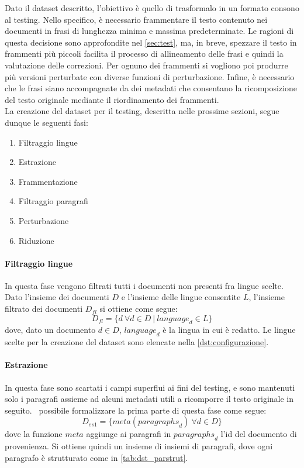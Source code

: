 Dato il dataset descritto, l'obiettivo è quello di trasformalo in un formato consono al testing. Nello specifico, è necessario frammentare il testo contenuto nei documenti in frasi di lunghezza minima e massima predeterminate. Le ragioni di questa decisione sono approfondite nel \autoref{sec:test}, ma, in breve, spezzare il testo in frammenti più piccoli facilita il processo di allineamento delle frasi e quindi la valutazione delle correzioni. Per ognuno dei frammenti si vogliono poi produrre più versioni perturbate con diverse funzioni di perturbazione. Infine, è necessario che le frasi siano accompagnate da dei metadati che consentano la ricomposizione del testo originale mediante il riordinamento dei frammenti.\\
La creazione del dataset per il testing, descritta nelle prossime sezioni, segue dunque le seguenti fasi:
\begin{enumerate}
\item Filtraggio lingue
\item Estrazione
\item Frammentazione
\item Filtraggio paragrafi
\item Perturbazione
\item Riduzione
\end{enumerate}

\paragraph{Filtraggio lingue}
In questa fase vengono filtrati tutti i documenti non presenti fra lingue scelte. Dato l'insieme dei documenti $D$ e l'insieme delle lingue consentite $L$, l'insieme filtrato dei documenti $D_{fl}$ si ottiene come segue:
\begin{equation}
D_{fl} = \{d\ \forall d \in D\ |\ \textit{language}_d \in L  \} 
\end{equation}
dove, dato un documento $d \in D$, $\textit{language}_d$ è la lingua in cui è redatto. Le lingue scelte per la creazione del dataset sono elencate nella \autoref{dst:configurazione}.

\paragraph{Estrazione}
In questa fase sono scartati i campi superflui ai fini del testing, e sono mantenuti solo i paragrafi assieme ad alcuni metadati utili a ricomporre il testo originale in seguito. \E\ possibile formalizzare la prima parte di questa fase come segue:
\begin{equation}
D_{es1} = \{ meta({paragraphs}_d)\ \forall d \in D  \}
\end{equation}
dove la funzione $meta$ aggiunge ai paragrafi in ${paragraphs}_d$ l'id del documento di provenienza. Si ottiene quindi un insieme di insiemi di paragrafi, dove ogni paragrafo è strutturato come in \autoref{tab:dst_parstrut}.


